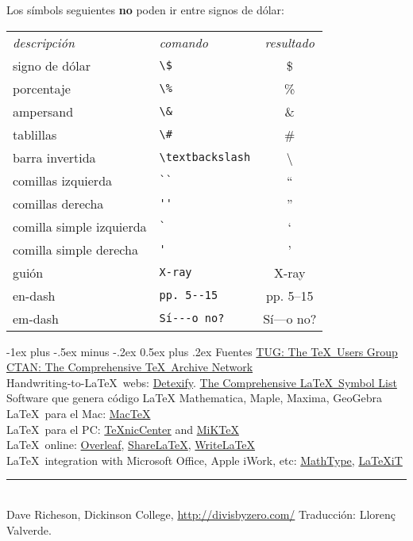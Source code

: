 \documentclass[10pt,landscape]{article}
\makeatletter
\renewcommand{\section}{\@startsection{section}{1}{0mm}%
                                {-1ex plus -.5ex minus -.2ex}%
                                {0.5ex plus .2ex}%
                                {\normalfont\large\bfseries}}
\makeatother
\begin{document}
\begin{multicols}{3}
Los símbols seguientes \textbf{no} poden ir entre signos de dólar:

\begin{tabular}{llc}
\emph{descripción} & \emph{comando} & \emph{resultado}\\
signo de dólar  & \verb!\$! & \$ \\
porcentaje & \verb!\%! & \% \\
ampersand & \verb!\&! & \& \\
tablillas & \verb!\#! & \# \\
barra invertida & \verb!\textbackslash! & \textbackslash \\
comillas izquierda  & \verb!``! & `` \\
comillas derecha & \verb!''! & '' \\
comilla simple izquierda  & \verb!`! & ` \\
comilla simple derecha & \verb!'! & ' \\
guión & \verb!X-ray! & X-ray\\
en-dash & \verb!pp. 5--15! & pp. 5--15 \\
em-dash & \verb!Sí---o no?! & Sí---o no? 
\end{tabular}

\section{Fuentes}
\href{http://www.tug.org/}{TUG: The \TeX\ Users Group}\\
\href{http://www.ctan.org/}{CTAN: The Comprehensive \TeX\ Archive Network}\\
Handwriting-to-\LaTeX\ webs: \href{http://detexify.kirelabs.org/}{Detexify}.
\href{ftp://tug.ctan.org/pub/tex-archive/info/symbols/comprehensive/symbols-letter.pdf}{The Comprehensive \LaTeX\ Symbol List}\\ 
Software que genera código \LaTeX\: Mathematica, Maple, Maxima, GeoGebra\\ %
\LaTeX\ para el Mac: \href{http://www.tug.org/mactex/}{Mac\TeX}\\
\LaTeX\ para el PC: \href{http://www.texniccenter.org/}{{\TeX}nicCenter} and \href{http://miktex.org/}{MiK\TeX}\\
\LaTeX\ online: \href{http://es.overleaf.com}{Overleaf}, \href{http://www.sharelatex.com/}{ShareLaTeX}, \href{http://www.writelatex.com/}{WriteLaTeX}\\
\LaTeX\ integration with Microsoft Office, Apple iWork, etc: \href{http://www.dessci.com/en/products/mathtype/}{MathType}, \href{http://www.chachatelier.fr/latexit/}{{\LaTeX}{iT}}
\vfill
\hrule
~\\
Dave Richeson, Dickinson College, \href{http://divisbyzero.com/}{http://divisbyzero.com/}
Traducción: Llorenç Valverde. 
\end{multicols}
\end{document}
